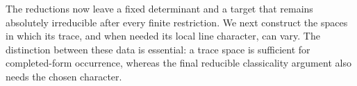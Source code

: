 The reductions now leave a fixed determinant and a target that remains
absolutely irreducible after every finite restriction. We next construct
the spaces in which its trace, and when needed its local line character,
can vary. The distinction between these data is essential: a trace
space is sufficient for completed-form occurrence, whereas the final
reducible classicality argument also needs the chosen character.
